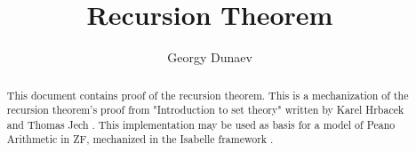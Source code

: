 \documentclass[11pt,a4paper]{article}
\begin{document}
\title{Recursion Theorem}
\author{Georgy Dunaev}
\maketitle

\begin{abstract}
  This document contains proof of the recursion theorem.
  This is a mechanization of the recursion theorem's proof from 
  "Introduction to set theory" written by Karel Hrbacek 
  and Thomas Jech \cite{HrbacekJech}. This implementation may be used as basis for 
  a model of Peano Arithmetic in ZF, mechanized in the Isabelle framework \cite{LNCS2283}.
\end{abstract}

\tableofcontents





\end{document}
